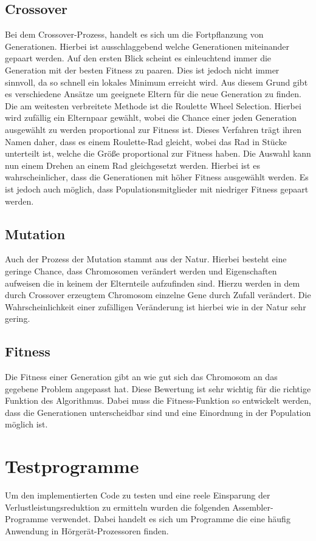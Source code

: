 \subsection{Crossover}
Bei dem Crossover-Prozess, handelt es sich um die Fortpflanzung von Generationen. Hierbei ist ausschlaggebend welche Generationen miteinander gepaart werden. Auf den ersten Blick scheint es einleuchtend immer die Generation mit der besten Fitness zu paaren. Dies ist jedoch nicht immer sinnvoll, da so schnell ein lokales Minimum erreicht wird. Aus diesem Grund gibt es verschiedene Ansätze um geeignete Eltern für die neue Generation zu finden. Die am weitesten verbreitete Methode ist die Roulette Wheel Selection. Hierbei wird zufällig ein Elternpaar gewählt, wobei die Chance einer jeden Generation ausgewählt zu werden proportional zur Fitness ist. Dieses Verfahren trägt ihren Namen daher, dass es einem Roulette-Rad gleicht, wobei das Rad in Stücke unterteilt ist, welche die Größe proportional zur Fitness haben. Die Auswahl kann nun einem Drehen an einem Rad gleichgesetzt werden. Hierbei ist es wahrscheinlicher, dass die Generationen mit höher Fitness ausgewählt werden. Es ist jedoch auch möglich, dass Populationsmitglieder mit niedriger Fitness gepaart werden.

\subsection{Mutation}
Auch der Prozess der Mutation stammt aus der Natur. Hierbei besteht eine geringe Chance, dass Chromosomen verändert werden und Eigenschaften aufweisen die in keinem der Elternteile aufzufinden sind. Hierzu werden in dem durch Crossover erzeugtem Chromosom einzelne Gene durch Zufall verändert. Die Wahrscheinlichkeit einer zufälligen Veränderung ist hierbei wie in der Natur sehr gering.
\subsection{Fitness}
Die Fitness einer Generation gibt an wie gut sich das Chromosom an das gegebene Problem angepasst hat. Diese Bewertung ist sehr wichtig für die richtige Funktion des Algorithmus. Dabei muss die Fitness-Funktion so entwickelt werden, dass die Generationen unterscheidbar sind und eine Einordnung in der Population möglich ist. 

\section{Testprogramme}
\label{sec:testprogamme}
Um den implementierten Code zu testen und eine reele Einsparung der Verlustleistungsreduktion zu ermitteln wurden die folgenden Assembler-Programme verwendet. Dabei handelt es sich um Programme die eine häufig Anwendung in Hörgerät-Prozessoren finden.
